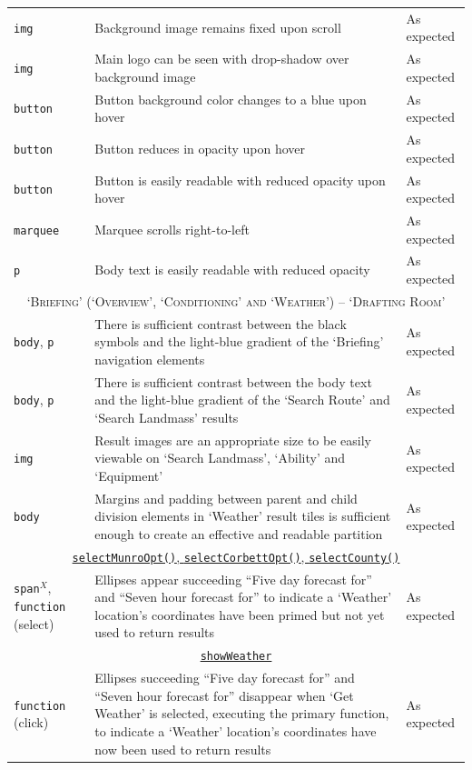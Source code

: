 \documentclass[11pt, english]{article}
\begin{document}
\begin{center}
\begin{longtable}{p{3cm}p{8cm}p{2cm}}
		\texttt{img} & Background image remains fixed upon scroll & As expected\\
		\texttt{img} & Main logo can be seen with drop-shadow over background image & As expected\\
		\texttt{button} & Button background color changes to a blue upon hover & As expected\\
		\texttt{button} & Button reduces in opacity upon hover & As expected\\
		\texttt{button} & Button is easily readable with reduced opacity upon hover & As expected\\
		\texttt{marquee} & Marquee scrolls right-to-left & As expected\\
		\texttt{p} & Body text is easily readable with reduced opacity & As expected\\
		\hline
		\multicolumn{3}{c}{\textsc{`Briefing' (`Overview', `Conditioning' and `Weather') -- `Drafting Room'}}\\
		\hline
		\texttt{body}, \texttt{p} & There is sufficient contrast between the black symbols and the light-blue gradient of the `Briefing' navigation elements & As expected\\
		\texttt{body}, \texttt{p} & There is sufficient contrast between the body text and the light-blue gradient of the `Search Route' and `Search Landmass' results & As expected\\
		\texttt{img} & Result images are an appropriate size to be easily viewable on `Search Landmass', `Ability' and `Equipment' & As expected\\
		\texttt{body} & Margins and padding between parent and child division elements in `Weather' result tiles is sufficient enough to create an effective and readable partition & As expected\\
		\multicolumn{3}{c}{\underline{\texttt{selectMunroOpt()}, \texttt{selectCorbettOpt()}, \texttt{selectCounty()}}}\\
		\texttt{span}$^{X}$, \texttt{function} (select) & Ellipses appear succeeding ``Five day forecast for'' and ``Seven hour forecast for'' to indicate a `Weather' location's coordinates have been primed but not yet used to return results & As expected\\
		\multicolumn{3}{c}{\underline{\texttt{showWeather}}}\\
		\texttt{function} (click) & Ellipses succeeding ``Five day forecast for'' and ``Seven hour forecast for'' disappear when `Get Weather' is selected, executing the primary function, to indicate a `Weather' location's coordinates have now been used to return results & As expected\\

\end{longtable}
\end{center}
\end{document}

